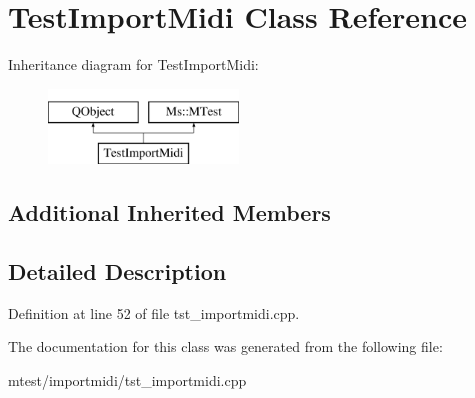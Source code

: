 \hypertarget{class_test_import_midi}{}\section{Test\+Import\+Midi Class Reference}
\label{class_test_import_midi}
Inheritance diagram for Test\+Import\+Midi\+:\begin{figure}[H]
\begin{center}
\leavevmode
\includegraphics[height=2.000000cm]{class_test_import_midi}
\end{center}
\end{figure}
\subsection*{Additional Inherited Members}


\subsection{Detailed Description}


Definition at line 52 of file tst\+\_\+importmidi.\+cpp.



The documentation for this class was generated from the following file\+:\begin{DoxyCompactItemize}
\item 
mtest/importmidi/tst\+\_\+importmidi.\+cpp\end{DoxyCompactItemize}
